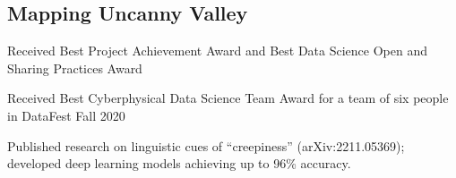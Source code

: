 \documentclass[10pt]{article}
\begin{document}
\subsection*{Mapping Uncanny Valley \hfill {}}
\noindent
\begin{asparaitem}
    \item Received Best Project Achievement Award and Best Data Science Open and
    Sharing Practices Award
    \item Received Best Cyberphysical Data Science Team Award for a team of six people
    in DataFest Fall 2020
    \item Published research on linguistic cues of “creepiness” (arXiv:2211.05369); developed deep learning models achieving up to 96\% accuracy.  

\end{asparaitem}

\end{document}

